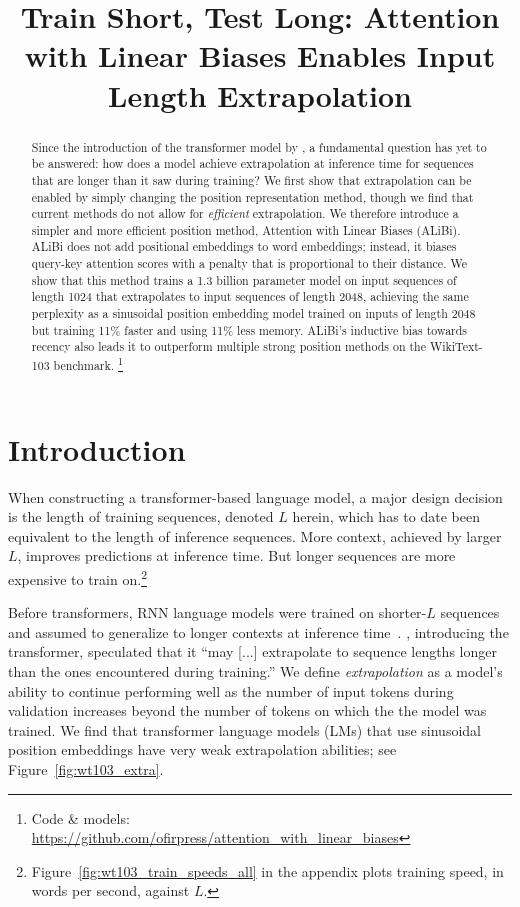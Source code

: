 \title{Train Short, Test Long: Attention with Linear Biases Enables Input Length Extrapolation}



\maketitle

\begin{abstract}

Since the introduction of the transformer model by \citet{vaswani}, a fundamental question has yet to be answered:  how does a model achieve extrapolation at inference time for sequences that are longer than it saw during training? 
We first show that extrapolation can be enabled by simply changing the position representation method, though we find that current methods do not allow for \emph{efficient} extrapolation. 
We therefore introduce a simpler and more efficient position method, Attention with Linear Biases (ALiBi). ALiBi does not add positional embeddings to word embeddings;  instead, it biases query-key attention scores with a penalty that is proportional to their distance. We show that this method trains a 1.3 billion parameter model on input sequences of length 1024 that extrapolates to input sequences of length 2048, achieving the same perplexity as a sinusoidal position embedding model trained on inputs of length 2048 but training 11\% faster and using 11\% less memory. 
ALiBi's inductive bias towards recency also leads it to outperform multiple strong position methods on the WikiText-103 benchmark.%
\footnote{Code \& models: \url{https://github.com/ofirpress/attention_with_linear_biases}}

\end{abstract}

\section{Introduction}
\label{sec:intro}

When constructing a transformer-based language model, a major design decision is the length of training sequences, denoted $L$ herein, which has to date  been equivalent to the length of inference sequences.  More context, achieved by larger $L$, improves predictions at inference time.  But longer sequences are more expensive to train on.\footnote{Figure~\ref{fig:wt103_train_speeds_all} in the appendix plots training speed, in words per second, against $L$.}  

Before transformers, RNN language models were trained on shorter-$L$ sequences and assumed to generalize to longer contexts at inference time~\citep{Mikolov2010RecurrentNN, Mikolov2012ContextDR, zaremba2014recurrent}.  \citet{vaswani}, introducing the transformer, speculated that it ``may [...] extrapolate to sequence lengths longer than the ones encountered during training.''  
We define \emph{extrapolation} as a model's ability to continue performing well as the number of input tokens during validation increases beyond the number of tokens on which the the model was trained. 
We find that transformer language models (LMs)  that use sinusoidal position embeddings have very weak  %
extrapolation abilities; see Figure~\ref{fig:wt103_extra}.

